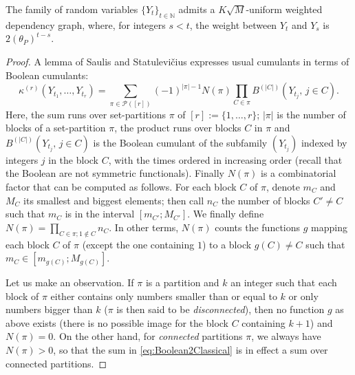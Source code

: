\documentclass[envcountsame]{svmult}
\newcommand{\N}{\mathbb{N}}
\def\PPP{\mathcal{P}}
\begin{document}
\begin{proposition}
  \label{prop:UWDG_Markov}
The family of random variables $\{Y_t\}_{t \in \N}$ admits a $K\sqrt{M}$-uniform weighted dependency graph,
where, for integers $s<t$, the weight between $Y_t$ and $Y_s$ is $2(\theta_P)^{t-s}$.
\end{proposition}
\begin{proof}
  A lemma of Saulis and Statulevi\v{c}ius \cite[Lemma 1.1]{LivreOrange:Cumulants} expresses usual cumulants
  in terms of Boolean cumulants:
 \begin{equation}
   \kappa^{(r)}(Y_{t_1},\ldots,Y_{t_r}) = \sum_{\pi \in \PPP([r])} (-1)^{|\pi|-1}
 N(\pi) \prod_{C \in \pi} B^{(|C|)}(Y_{t_j},\,  j \in C).
 \label{eq:Boolean2Classical}
 \end{equation}
 Here, the sum runs over set-partitions $\pi$ of $[r]:=\{1,\ldots,r\}$;
 $|\pi|$ is the number of blocks of a set-partition $\pi$, the product runs over blocks $C$ in $\pi$
 and $B^{(|C|)}(Y_{t_j},\, j \in C)$ is the Boolean cumulant of the subfamily $(Y_{t_j})$
 indexed by integers $j$ in the block $C$, with the times ordered in increasing order (recall that the Boolean are not symmetric functionals).
 Finally $N(\pi)$ is a combinatorial factor that can be computed as follows.
 For each block $C$ of $\pi$, denote $m_C$ and $M_C$ its smallest and biggest elements;
 then call $n_C$ the number of blocks $C' \ne C$
 such that $m_C$ is in the interval $[m_{C'};M_{C'}]$. 
 We finally define $N(\pi)=\prod_{C \in \pi; 1 \notin C} n_C$.
 In other terms, $N(\pi)$ counts the functions $g$ mapping 
 each block $C$ of $\pi$ (except the one containing $1$) to a block $g(C) \ne C$
 such that $m_C \in [m_{g(C)};M_{g(C)}]$.\medskip
 
 
 Let us make an observation.
 If $\pi$ is a partition and $k$ an integer such that each block
 of $\pi$ either contains only numbers smaller than or equal to $k$
 or only numbers bigger than $k$ ($\pi$ is then said to be {\em disconnected}),
 then no function $g$ as above exists (there is no possible image for the block $C$ containing $k+1$)
 and $N(\pi)=0$. On the other hand,
 for {\em connected} partitions $\pi$, we always have $N(\pi)>0$,
 so that the sum in \eqref{eq:Boolean2Classical} is in effect a sum over connected partitions.
 \medskip
 

\end{proof}
\end{document}
